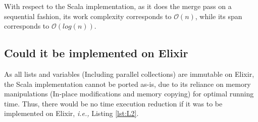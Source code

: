 \documentclass{article}
\begin{document}
With respect to the Scala implementation, as it does the merge pass on a sequential fashion, its work complexity corresponds to $\mathcal{O}(n)$, while its span corresponds to $\mathcal{O}(log(n))$. 

\subsection{Could it be implemented on Elixir}
As all lists and variables (Including parallel collections) are immutable on Elixir, the Scala implementation cannot be ported as-is, due to its reliance on memory manipulations (In-place modifications and memory copying) for optimal running time. Thus, there would be no time execution reduction if it was to be implemented on Elixir, \textit{i.e.,} Listing \ref{lst:L2}. 








\end{document}
